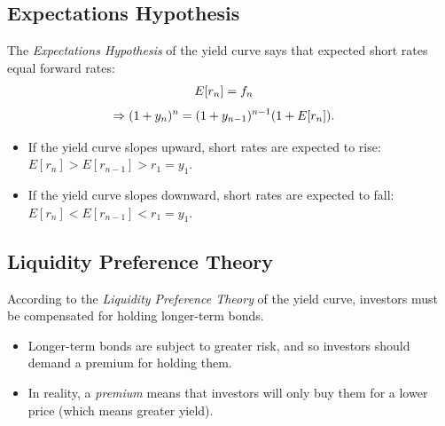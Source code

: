 \documentclass[letterpaper,10pt,english]{sphinxmanual}
\begin{document}
\subsection{Expectations Hypothesis}
\label{termStructure:expectations-hypothesis}
The \emph{Expectations Hypothesis} of the yield curve says that expected
short rates equal forward rates:
\begin{gather}
\begin{split}E[r_n] & = f_n\end{split}\notag
\end{gather}\begin{gather}
\begin{split}\Rightarrow (1+y_n)^n & = (1+y_{n-1})^{n-1}(1+E[r_n]).\end{split}\notag
\end{gather}\begin{itemize}
\item {} 
If the yield curve slopes upward, short rates are expected to rise:
$E[r_n] > E[r_{n-1}] > r_1 = y_1$.

\end{itemize}
\begin{itemize}
\item {} 
If the yield curve slopes downward, short rates are expected to
fall: $E[r_n] < E[r_{n-1}] < r_1 = y_1$.

\end{itemize}


\subsection{Liquidity Preference Theory}
\label{termStructure:liquidity-preference-theory}
According to the \emph{Liquidity Preference Theory} of the yield curve,
investors must be compensated for holding longer-term bonds.
\begin{itemize}
\item {} 
Longer-term bonds are subject to greater risk, and so investors
should demand a premium for holding them.

\end{itemize}
\begin{itemize}
\item {} 
In reality, a \emph{premium} means that investors will only buy them for
a lower price (which means greater yield).

\end{itemize}
\end{document}
